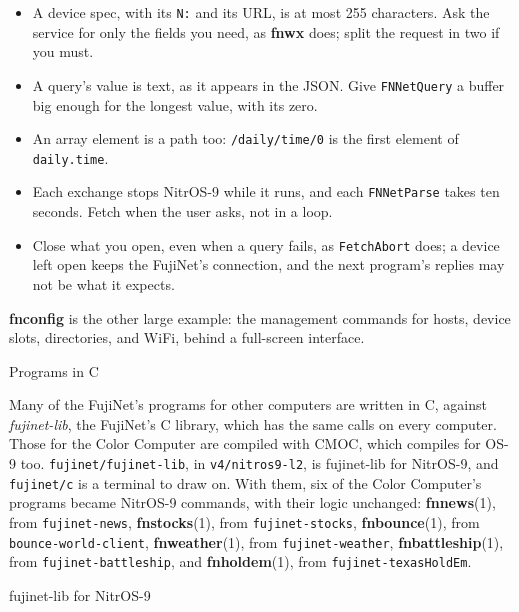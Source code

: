 \documentclass[10pt,twoside,openany]{book}
\makeatletter
\newcommand{\cmd}[1]{\textbf{#1}}            %
\newcommand{\file}[1]{\texttt{#1}}           %
\newcommand{\rp}[2]{\textbf{#1}(#2)}         %
\renewcommand{\section}{\@startsection{section}{1}{0pt}{3.2ex plus 1ex}{1.2ex}%
  {\sffamily\bfseries\large}}
\renewcommand{\subsection}{\@startsection{subsection}{2}{0pt}{2.4ex plus 0.6ex}{0.8ex}%
  {\sffamily\bfseries\normalsize}}
\makeatother
\begin{document}
\begin{itemize}\setlength{\itemsep}{0pt}
\item A device spec, with its \texttt{N:} and its URL, is at most 255
characters. Ask the service for only the fields you need, as
\cmd{fnwx} does; split the request in two if you must.
\item A query's value is text, as it appears in the JSON. Give
\texttt{FNNetQuery} a buffer big enough for the longest value, with its
zero.
\item An array element is a path too: \texttt{/daily/time/0} is the first
element of \texttt{daily.time}.
\item Each exchange stops NitrOS-9 while it runs, and each
\texttt{FNNetParse} takes ten seconds. Fetch when the user asks, not in a
loop.
\item Close what you open, even when a query fails, as
\texttt{FetchAbort} does; a device left open keeps the FujiNet's
connection, and the next program's replies may not be what it expects.
\end{itemize}

\cmd{fnconfig} is the other large example: the management commands for
hosts, device slots, directories, and WiFi, behind a full-screen
interface.

\section{Programs in C}

Many of the FujiNet's programs for other computers are written in C,
against \emph{fujinet-lib}, the FujiNet's C library, which has the same
calls on every computer. Those for the Color Computer are compiled with
CMOC, which compiles for OS-9 too. \file{fujinet/fujinet-lib}, in
\file{v4/nitros9-l2}, is fujinet-lib for NitrOS-9, and \file{fujinet/c}
is a terminal to draw on. With them, six of the Color Computer's
programs became NitrOS-9 commands, with their logic unchanged:
\rp{fnnews}{1}, from \texttt{fujinet-news}, \rp{fnstocks}{1}, from
\texttt{fujinet-stocks}, \rp{fnbounce}{1}, from
\texttt{bounce-world-client}, \rp{fnweather}{1}, from
\texttt{fujinet-weather}, \rp{fnbattleship}{1}, from
\texttt{fujinet-battleship}, and \rp{fnholdem}{1}, from
\texttt{fujinet-texasHoldEm}.

\subsection{fujinet-lib for NitrOS-9}
\end{document}

